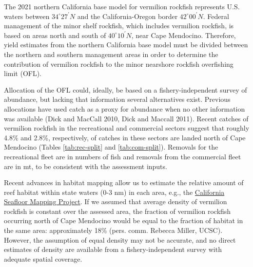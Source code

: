 \documentclass[11pt,
  english,
]{article}
\begin{document}
\leavevmode\tagmcend\tagstructend

\renewcommand{\thepage}{I\arabic{page}}
\renewcommand{\thefigure}{I\arabic{figure}}
\renewcommand{\thetable}{I\arabic{table}}
\setcounter{page}{1}
\setcounter{figure}{0}
\setcounter{table}{0}

The 2021 northern California base model for vermilion rockfish represents U.S. waters between $34^\circ 27^\prime N$ and the California-Oregon border $42^\circ 00^\prime N$. Federal management of the minor shelf rockfish, which includes vermilion rockfish, is based on areas north and south of $40^\circ 10^\prime N$, near Cape Mendocino. Therefore, yield estimates from the northern California base model must be divided between the northern and southern management areas in order to determine the contribution of vermilion rockfish to the minor nearshore rockfish overfishing limit (OFL).

Allocation of the OFL could, ideally, be based on a fishery-independent survey of abundance, but lacking that information several alternatives exist. Previous allocations have used catch as a proxy for abundance when no other information was available {(Dick and MacCall 2010, Dick and Maccall 2011)\leavevmode\tagmcend\tagstructend}. Recent catches of vermilion rockfish in the recreational and commercial sectors suggest that roughly 4.8\% and 2.8\%, respectively, of catches in these sectors are landed north of Cape Mendocino (Tables \ref{tab:rec-split} and \ref{tab:com-split}). Removals for the recreational fleet are in numbers of fish and removals from the commercial fleet are in mt, to be consistent with the assessment inputs.

Recent advances in habitat mapping allow us to estimate the relative amount of reef habitat within state waters (0-3 nm) in each area, e.g., the {\href{https://walrus.wr.usgs.gov/mapping/csmp/}{California Seafloor Mapping Project}\leavevmode\tagmcend\tagstructend}. If we assumed that average density of vermilion rockfish is constant over the assessed area, the fraction of vermilion rockfish occurring north of Cape Mendocino would be equal to the fraction of habitat in the same area: approximately 18\% (pers. comm. Rebecca Miller, UCSC). However, the assumption of equal density may not be accurate, and no direct estimates of density are available from a fishery-independent survey with adequate spatial coverage.
\end{document}
